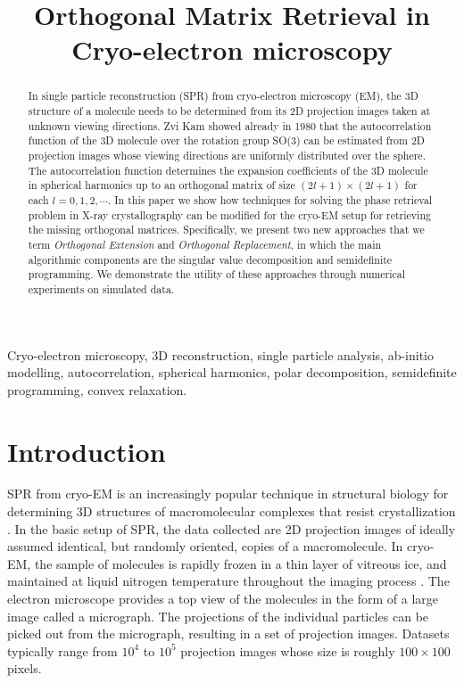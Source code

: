\documentclass{article}
\title{Orthogonal Matrix Retrieval in Cryo-electron microscopy}
\begin{document}
%
\maketitle
%
\begin{abstract}
In single particle reconstruction (SPR) from cryo-electron microscopy (EM), the 3D structure of a molecule needs to be determined from its 2D projection images taken at unknown viewing directions. Zvi Kam showed already in 1980 that the autocorrelation function of the 3D molecule over the rotation group SO(3) can be estimated from 2D projection images whose viewing directions are uniformly distributed over the sphere. The autocorrelation function determines the expansion coefficients of the 3D molecule in spherical harmonics up to an orthogonal matrix of size $(2l+1)\times (2l+1)$ for each $l=0,1,2,\cdots$. In this paper we show how techniques for solving the phase retrieval problem in X-ray crystallography can be modified for the cryo-EM setup for retrieving the missing orthogonal matrices. Specifically, we present two new approaches that we term {\em Orthogonal Extension} and {\em Orthogonal Replacement}, in which the main algorithmic components are the singular value decomposition and semidefinite programming. We demonstrate the utility of these approaches through numerical experiments on simulated data.
\end{abstract}
%
\begin{keywords}
Cryo-electron microscopy, 3D reconstruction, single particle analysis, ab-initio modelling, autocorrelation, spherical harmonics, polar decomposition, semidefinite programming, convex relaxation.
\end{keywords}
%
\section{Introduction}
\label{sec:intro}

SPR from cryo-EM is an increasingly popular technique in structural biology for
determining 3D structures of macromolecular complexes that resist crystallization \cite{Frank1,resolution_revolution,Revol}.
In the basic setup of SPR, the data collected are 2D projection images of ideally assumed identical, but randomly oriented, copies of a macromolecule. In cryo-EM, the sample of molecules is rapidly frozen in a thin layer of vitreous ice, and maintained at liquid nitrogen temperature throughout the imaging process \cite{wang06}. The electron microscope provides a top view of the molecules in the form of a large image called a micrograph. The projections of the individual particles can be picked out from the micrograph, resulting in a set of projection images. Datasets typically range from $10^4$ to $10^5$ projection images whose size is roughly $100 \times 100$ pixels.
\end{document}
